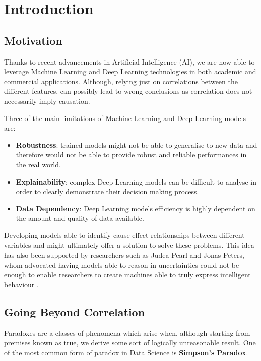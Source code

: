 \chapter{Introduction}
\section{Motivation}
\vspace{-0.1cm}
Thanks to recent advancements in Artificial Intelligence (AI), we are now able to leverage Machine Learning and Deep Learning technologies in both academic and commercial applications. Although, relying just on correlations between the different features, can possibly lead to wrong conclusions as correlation does not necessarily imply causation.

Three of the main limitations of Machine Learning and Deep Learning models are: 
\vspace{-0.2cm}
\begin{itemize}
    \item \textbf{Robustness}: trained models might not be able to generalise to new data and therefore would not be able to provide robust and reliable performances in the real world.
    \item \textbf{Explainability}: complex Deep Learning models can be difficult to analyse in order to clearly demonstrate their decision making process. 
    \item \textbf{Data Dependency}: Deep Learning models efficiency is highly dependent on the amount and quality of data available. 
\end{itemize}
\vspace{-0.2cm}
Developing models able to identify cause-effect relationships between different variables and might ultimately offer a solution to solve these problems. This idea has also been supported by researchers such as Judea Pearl and Jonas Peters, whom advocated having models able to reason in uncertainties could not be enough to enable researchers to create machines able to truly express intelligent behaviour \cite{art_perl}.

\section{Going Beyond Correlation}
\label{simp_ref}
Paradoxes are a classes of phenomena which arise when, although starting from premises known as true, we derive some sort of logically unreasonable result. One of the most common form of paradox in Data Science is \textbf{Simpson's Paradox}.

